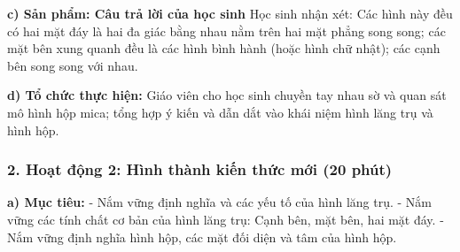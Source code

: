 \documentclass[12pt, a4paper]{article}
\begin{document}
\noindent \textbf{c) Sản phẩm: Câu trả lời của học sinh}
Học sinh nhận xét: Các hình này đều có hai mặt đáy là hai đa giác bằng nhau nằm trên hai mặt phẳng song song; các mặt bên xung quanh đều là các hình bình hành (hoặc hình chữ nhật); các cạnh bên song song với nhau.

\noindent \textbf{d) Tổ chức thực hiện:}
Giáo viên cho học sinh chuyền tay nhau sờ và quan sát mô hình hộp mica; tổng hợp ý kiến và dẫn dắt vào khái niệm hình lăng trụ và hình hộp.

\subsubsection*{2. Hoạt động 2: Hình thành kiến thức mới (20 phút)}

\noindent \textbf{a) Mục tiêu:}
- Nắm vững định nghĩa và các yếu tố của hình lăng trụ.
- Nắm vững các tính chất cơ bản của hình lăng trụ: Cạnh bên, mặt bên, hai mặt đáy.
- Nắm vững định nghĩa hình hộp, các mặt đối diện và tâm của hình hộp.
\end{document}
